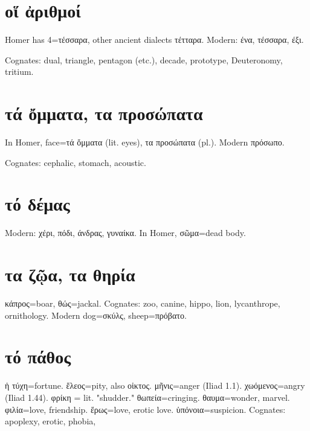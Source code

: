 \documentclass[12pt,openany]{book}
\newenvironment{notes}{\vfill\scriptsize\begin{flushright}}{\end{flushright}}
\newcommand{\fig}[1]{\begin{center}\end{center}}
\begin{document}

\chapter{οἵ ἀριθμοί}

\fig{numbers/numbers.svg}

\begin{notes}
Homer has 4=τέσσαρα, other ancient dialects τέτταρα.
Modern: ένα, τέσσαρα, έξι.

Cognates: dual, triangle, pentagon (etc.), decade,
prototype, Deuteronomy, tritium.
\end{notes}


\chapter{τά ὄμματα, τα προσώπατα}

\fig{face/face.svg}

\begin{notes}
In Homer, face=τά ὄμματα (lit. eyes), τα προσώπατα (pl.).
Modern πρόσωπο.

Cognates: cephalic, stomach,
acoustic.
\end{notes}


\chapter{τό δέμας}

\fig{body/body.svg}

\begin{notes}
Modern: χέρι, πόδι, άνδρας, γυναίκα. In Homer, σῶμα=dead body.
\end{notes}


\chapter{τα ζῷα, τα θηρία}

\fig{animals/animals.svg}

\begin{notes}
κάπρος=boar,  θώς=jackal. Cognates: zoo, canine, hippo, lion, lycanthrope, ornithology.
Modern dog=σκύλς, sheep=πρόβατο.
\end{notes}


\chapter{τό πάθος}

\fig{emotions/emotions.svg}

\begin{notes}
ἡ τύχη=fortune. ἕλεος=pity, also οἱκτος. μῆνις=anger (Iliad 1.1). χωόμενος=angry (Iliad 1.44). φρίκη = lit. "shudder."
θωπεία=cringing. θαυμα=wonder, marvel. φιλία=love, friendship. ἕρως=love, erotic love. ὑπόνοια=suspicion.
Cognates: apoplexy, erotic, phobia, 
\end{notes}
\end{document}
